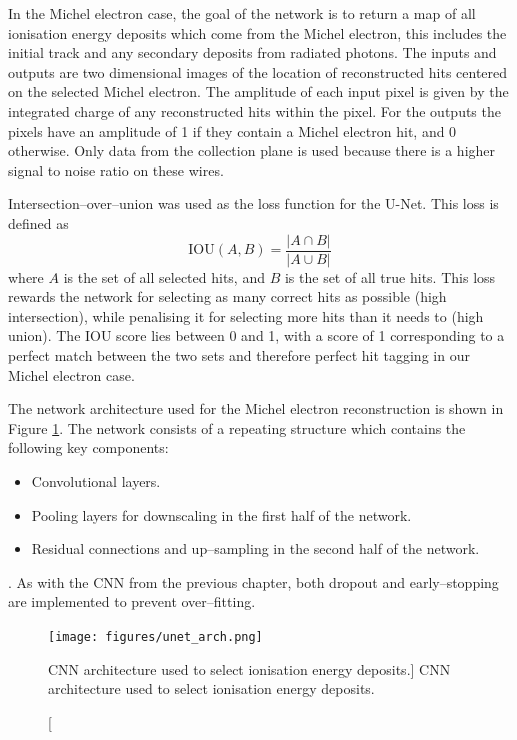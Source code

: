 In the Michel electron case, the goal of the network is to return a map of all
ionisation energy deposits which come from the Michel electron, this includes
the initial track and any secondary deposits from radiated photons. The inputs
and outputs are two dimensional images of the location of reconstructed hits
centered on the selected Michel electron. The amplitude of each input pixel is 
given by the integrated charge of any reconstructed hits within the pixel. For
the outputs the pixels have an amplitude of 1 if they contain a Michel electron
hit, and 0 otherwise. Only data from the collection plane is used because there 
is a higher signal to noise ratio on these wires. 

Intersection--over--union was used as the loss function for the U-Net. This loss
is defined as 
\begin{equation}
	\mbox{IOU}(A, B) = \frac{|A \cap B|}{|A \cup B|}
\end{equation}
where $A$ is the set of all selected hits, and $B$ is the set of all true 
hits\cite{rezatofighi2019generalized}. This loss rewards the network for 
selecting as many correct hits as possible (high intersection), while 
penalising it for selecting more hits than it needs to (high union). The IOU 
score lies between 0 and 1, with a score of 1 corresponding to a perfect match 
between the two sets and therefore perfect hit tagging in our Michel electron 
case.

The network architecture used for the Michel electron reconstruction is shown in
Figure \ref{fig:unet_arch}. The network consists of a repeating structure which
contains the following key components:
\begin{itemize}
	\item Convolutional layers.
	\item Pooling layers for downscaling in the first half of the network.
	\item Residual connections and up--sampling in the second half of the network.
\end{itemize}
. As with the CNN from the previous chapter, both 
dropout and early--stopping are implemented to prevent over--fitting.
\begin{figure}
	\centering
	\texttt{[image: figures/unet\_arch.png]}
	\caption
	[CNN architecture used to select ionisation energy deposits.]
	{CNN architecture used to select ionisation energy deposits.}
	\label{fig:unet_arch}
\end{figure}

